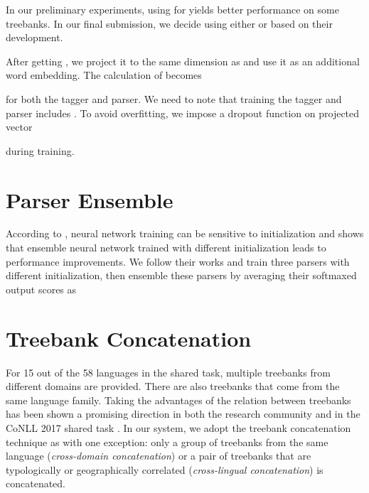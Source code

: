 \documentclass[11pt,a4paper]{article}
\begin{document}
In our preliminary experiments, using  for 
yields better performance on some treebanks.
In our final submission, we decide using either 
or  based on their development.

After getting , we project it
to the same dimension as  and
use it as an additional word embedding.
The calculation of  becomes

for both the tagger and parser.
We need to note that training the tagger and parser includes .
To avoid overfitting, we impose a dropout function on projected vector

during training.

\section{Parser Ensemble}\label{sec:ens}

According to \citet{reimers-gurevych:2017:EMNLP2017}, neural network training can
be sensitive to initialization and
\citet{DBLP:journals/corr/abs-1805-11224}  shows that ensemble
neural network trained with different initialization
leads to performance improvements.
We follow their works and train three parsers with different initialization,
then ensemble these parsers by averaging their softmaxed output scores as 


\section{Treebank Concatenation}\label{sec:comb}

For 15 out of the 58 languages in the shared task,
multiple treebanks from different domains are provided.
There are also treebanks that come from the same language family.
Taking the advantages of the relation between treebanks has been shown 
a promising direction in both the research community \cite{TACL892,guo-EtAl:2015:ACL-IJCNLP2,C16-1002}
and in the CoNLL 2017 shared task \cite{che-EtAl:2017:K17-3,bjorkelund-EtAl:2017:K17-3,shi-EtAl:2017:K17-3}.
In our system, we adopt the treebank concatenation technique as \citet{TACL892}
with one exception: only a group of treebanks from the same language (\textit{cross-domain concatenation})
or a pair of treebanks that are typologically or geographically correlated (\textit{cross-lingual concatenation})
is concatenated.
\end{document}
